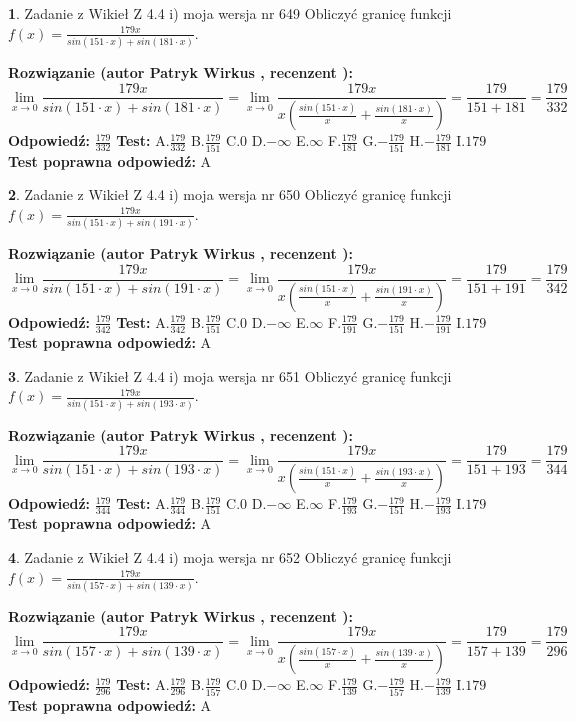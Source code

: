 \documentclass[12pt, a4paper]{article}
\theoremstyle{definition} %
\newtheorem{zad}{}
\newcommand{\zadStart}[1]{\begin{zad}#1\newline}
\newcommand{\zadStop}{\end{zad}}
\newcommand{\rozwStart}[2]{\noindent \textbf{Rozwiązanie (autor #1 , recenzent #2): }\newline}
\newcommand{\rozwStop}{\newline}
\newcommand{\odpStart}{\noindent \textbf{Odpowiedź:}\newline}
\newcommand{\odpStop}{\newline}
\newcommand{\testStart}{\noindent \textbf{Test:}\newline}
\newcommand{\testStop}{\newline}
\newcommand{\kluczStart}{\noindent \textbf{Test poprawna odpowiedź:}\newline}
\newcommand{\kluczStop}{\newline}
\begin{document}
\zadStart{Zadanie z Wikieł Z 4.4 i) moja wersja nr 649}
Obliczyć granicę funkcji $f(x)=\frac{179x}{sin(151\cdot x) +sin(181\cdot x)}$.
\zadStop
\rozwStart{Patryk Wirkus}{}
$$\lim\limits_{x\to 0}\frac{179x}{sin(151\cdot x) +sin(181\cdot x)}=\lim\limits_{x\to 0}\frac{179x}{x(\frac{sin(151\cdot x)}{x}+\frac{sin(181\cdot x)}{x})}=\frac{179}{151+181} = \frac{179}{332}$$
\rozwStop
\odpStart
$\frac{179}{332}$
\odpStop
\testStart
A.$\frac{179}{332}$
B.$\frac{179}{151}$
C.$0$
D.$-\infty$
E.$\infty$
F.$\frac{179}{181}$
G.$-\frac{179}{151}$
H.$-\frac{179}{181}$
I.$179$
\testStop
\kluczStart
A
\kluczStop



\zadStart{Zadanie z Wikieł Z 4.4 i) moja wersja nr 650}
Obliczyć granicę funkcji $f(x)=\frac{179x}{sin(151\cdot x) +sin(191\cdot x)}$.
\zadStop
\rozwStart{Patryk Wirkus}{}
$$\lim\limits_{x\to 0}\frac{179x}{sin(151\cdot x) +sin(191\cdot x)}=\lim\limits_{x\to 0}\frac{179x}{x(\frac{sin(151\cdot x)}{x}+\frac{sin(191\cdot x)}{x})}=\frac{179}{151+191} = \frac{179}{342}$$
\rozwStop
\odpStart
$\frac{179}{342}$
\odpStop
\testStart
A.$\frac{179}{342}$
B.$\frac{179}{151}$
C.$0$
D.$-\infty$
E.$\infty$
F.$\frac{179}{191}$
G.$-\frac{179}{151}$
H.$-\frac{179}{191}$
I.$179$
\testStop
\kluczStart
A
\kluczStop



\zadStart{Zadanie z Wikieł Z 4.4 i) moja wersja nr 651}
Obliczyć granicę funkcji $f(x)=\frac{179x}{sin(151\cdot x) +sin(193\cdot x)}$.
\zadStop
\rozwStart{Patryk Wirkus}{}
$$\lim\limits_{x\to 0}\frac{179x}{sin(151\cdot x) +sin(193\cdot x)}=\lim\limits_{x\to 0}\frac{179x}{x(\frac{sin(151\cdot x)}{x}+\frac{sin(193\cdot x)}{x})}=\frac{179}{151+193} = \frac{179}{344}$$
\rozwStop
\odpStart
$\frac{179}{344}$
\odpStop
\testStart
A.$\frac{179}{344}$
B.$\frac{179}{151}$
C.$0$
D.$-\infty$
E.$\infty$
F.$\frac{179}{193}$
G.$-\frac{179}{151}$
H.$-\frac{179}{193}$
I.$179$
\testStop
\kluczStart
A
\kluczStop



\zadStart{Zadanie z Wikieł Z 4.4 i) moja wersja nr 652}
Obliczyć granicę funkcji $f(x)=\frac{179x}{sin(157\cdot x) +sin(139\cdot x)}$.
\zadStop
\rozwStart{Patryk Wirkus}{}
$$\lim\limits_{x\to 0}\frac{179x}{sin(157\cdot x) +sin(139\cdot x)}=\lim\limits_{x\to 0}\frac{179x}{x(\frac{sin(157\cdot x)}{x}+\frac{sin(139\cdot x)}{x})}=\frac{179}{157+139} = \frac{179}{296}$$
\rozwStop
\odpStart
$\frac{179}{296}$
\odpStop
\testStart
A.$\frac{179}{296}$
B.$\frac{179}{157}$
C.$0$
D.$-\infty$
E.$\infty$
F.$\frac{179}{139}$
G.$-\frac{179}{157}$
H.$-\frac{179}{139}$
I.$179$
\testStop
\kluczStart
A
\kluczStop
\end{document}
